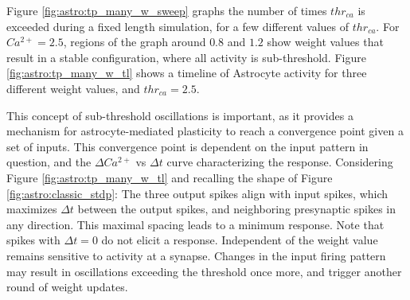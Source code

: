 
Figure \ref{fig:astro:tp_many_w_sweep} graphs the number of times $thr_{ca}$ is
exceeded during a fixed length simulation, for a few different values of
$thr_{ca}$. For $Ca^{2+}=2.5$, regions of the graph around $0.8$ and $1.2$ show
weight values that result in a stable configuration, where all \ca activity is
sub-threshold. Figure \ref{fig:astro:tp_many_w_tl} shows
a timeline of Astrocyte activity for three different weight values, and
$thr_{ca}=2.5$.



This concept of sub-threshold oscillations is important, as it provides a
mechanism for astrocyte-mediated plasticity to reach a convergence point given a
set of inputs. This convergence point is dependent on the input pattern in
question, and the $\Delta Ca^{2+}$ vs $\Delta t$ curve characterizing the \ca
response. Considering Figure \ref{fig:astro:tp_many_w_tl} and recalling the
shape of Figure \ref{fig:astro:classic_stdp}: The three output spikes align with
input spikes, which maximizes $\Delta t$ between the output spikes, and
neighboring presynaptic spikes in any direction. This maximal spacing leads to a
minimum \ca response. Note that spikes with $\Delta t=0$ do not elicit a \ca
response. Independent of the weight value \ca remains sensitive to activity at a
synapse. Changes in the input firing pattern may result in \ca oscillations
exceeding the threshold once more, and trigger another round of weight updates.


